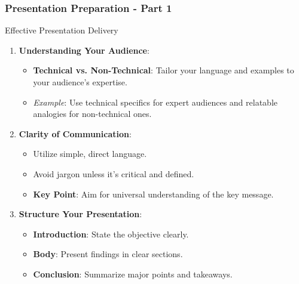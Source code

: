 \documentclass[aspectratio=169]{beamer}
\begin{document}
\begin{frame}[fragile]
    \frametitle{Presentation Preparation - Part 1}
    
    \begin{block}{Effective Presentation Delivery}
        \begin{enumerate}
            \item \textbf{Understanding Your Audience}:
            \begin{itemize}
                \item \textbf{Technical vs. Non-Technical}: Tailor your language and examples to your audience's expertise.
                \item \textit{Example}: Use technical specifics for expert audiences and relatable analogies for non-technical ones.
            \end{itemize}
            
            \item \textbf{Clarity of Communication}:
            \begin{itemize}
                \item Utilize simple, direct language.
                \item Avoid jargon unless it’s critical and defined.
                \item \textbf{Key Point}: Aim for universal understanding of the key message.
            \end{itemize}
            
            \item \textbf{Structure Your Presentation}:
            \begin{itemize}
                \item \textbf{Introduction}: State the objective clearly.
                \item \textbf{Body}: Present findings in clear sections.
                \item \textbf{Conclusion}: Summarize major points and takeaways.
            \end{itemize}
        \end{enumerate}
    \end{block}
    
\end{frame}
\end{document}
